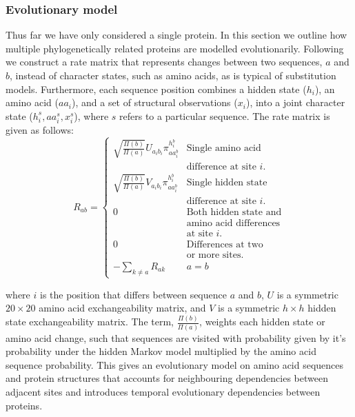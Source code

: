 \documentclass[nogrid]{MBE}%
\begin{document}
\subsubsection{Evolutionary model}
Thus far we have only considered a single protein. In this section we outline how multiple phylogenetically related proteins are modelled evolutionarily. Following \citet{choi2008basing} we construct a rate matrix that represents changes between two sequences, $a$ and $b$, instead of character states, such as amino acids, as is typical of substitution models. Furthermore, each sequence position combines a hidden state ($h_i$), an amino acid ($aa_i$), and a set of structural observations ($x_i$), into a joint character state ($h^{s}_i,aa^{s}_i,x^{s}_i$), where $s$ refers to a particular sequence. The rate matrix is given as follows:
\begin{equation}
\label{eq:ratematrix}
R_{ab}=\begin{cases}

\sqrt{\frac{\Pi(b)}{\Pi(a)}}U_{a_{i}b_{i}}\pi^{h^{b}_{i}}_{aa^{b}_{i}} & \text{Single amino acid}\\
& \text{difference at site $i$.}\\ 

\sqrt{\frac{\Pi(b)}{\Pi(a)}}V_{a_{i}b_{i}}\pi^{h^{b}_{i}}_{aa^{b}_{i}} & \text{Single hidden state}\\
& \text{difference at site $i$.}\\ 

0 & \text{Both hidden state and}\\
& \text{amino acid differences}\\
& \text{at site $i$.}\\ 

0 & \text{Differences at two}\\
& \text{or more sites.}\\

-\underset{k\neq a}{\sum}R_{ak} & a=b
\end{cases}
\end{equation}

where $i$ is the position that differs between sequence $a$ and $b$, $U$ is a symmetric $20\times{20}$ amino acid exchangeability matrix, and $V$ is a symmetric $h\times{h}$ hidden state exchangeability matrix. The term, $\frac{\Pi(b)}{\Pi(a)}$, weights each hidden state or amino acid change, such that sequences are visited with probability given by it's probability under the hidden Markov model multiplied by the amino acid sequence probability. This gives an evolutionary model on amino acid sequences and protein structures that accounts for neighbouring dependencies between adjacent sites and introduces temporal evolutionary dependencies between proteins.
\end{document}
